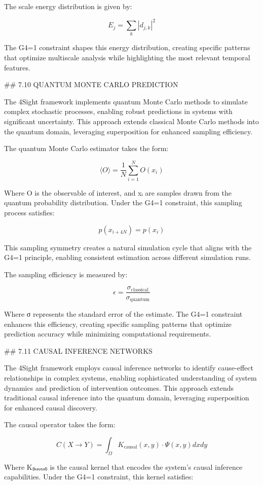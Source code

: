 The scale energy distribution is given by:

$$E_j = \sum_k |d_{j,k}|^2$$

The G4=1 constraint shapes this energy distribution, creating specific patterns that optimize multiscale analysis while highlighting the most relevant temporal features.

## 7.10 QUANTUM MONTE CARLO PREDICTION

The 4Sight framework implements quantum Monte Carlo methods to simulate complex stochastic processes, enabling robust predictions in systems with significant uncertainty. This approach extends classical Monte Carlo methods into the quantum domain, leveraging superposition for enhanced sampling efficiency.

The quantum Monte Carlo estimator takes the form:

$$\langle O \rangle = \frac{1}{N} \sum_{i=1}^N O(x_i)$$

Where O is the observable of interest, and xᵢ are samples drawn from the quantum probability distribution. Under the G4=1 constraint, this sampling process satisfies:

$$p(x_{i+4N}) = p(x_i)$$

This sampling symmetry creates a natural simulation cycle that aligns with the G4=1 principle, enabling consistent estimation across different simulation runs.

The sampling efficiency is measured by:

$$\epsilon = \frac{\sigma_{\text{classical}}}{\sigma_{\text{quantum}}}$$

Where σ represents the standard error of the estimate. The G4=1 constraint enhances this efficiency, creating specific sampling patterns that optimize prediction accuracy while minimizing computational requirements.

## 7.11 CAUSAL INFERENCE NETWORKS

The 4Sight framework employs causal inference networks to identify cause-effect relationships in complex systems, enabling sophisticated understanding of system dynamics and prediction of intervention outcomes. This approach extends traditional causal inference into the quantum domain, leveraging superposition for enhanced causal discovery.

The causal operator takes the form:

$$C(X \rightarrow Y) = \int_{\Omega} K_{\text{causal}}(x, y) \cdot \Psi(x, y) dx dy$$

Where K₍ₖₐᵤₛₐₗ₎ is the causal kernel that encodes the system's causal inference capabilities. Under the G4=1 constraint, this kernel satisfies:

